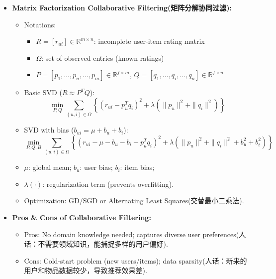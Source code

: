 \documentclass[UTF8]{ctexart}
\begin{document}
\begin{itemize}
    \item \textbf{Matrix Factorization Collaborative Filtering(矩阵分解协同过滤):}
    \begin{itemize}
        \item Notations: 
        \begin{itemize}
            \item $R = [r_{ui}] \in \mathbb{R}^{m \times n}$: incomplete user-item rating matrix
            \item $\Omega$: set of observed entries (known ratings)
            \item $P = [p_1, \ldots, p_u, \ldots, p_m] \in \mathbb{R}^{f \times m}$, \quad $Q = [q_1, \ldots, q_i, \ldots, q_n] \in \mathbb{R}^{f \times n}$
        \end{itemize}
        
        \item Basic SVD ($R \approx P^T Q$):
        \[\min_{P,Q} \sum_{(u,i) \in \Omega} \left\{ (r_{ui} - p_u^T q_i)^2 + \lambda (\|p_u\|^2 + \|q_i\|^2) \right\}\]
        
        \item SVD with bias ($b_{ui} = \mu + b_u + b_i$):
        \[\min_{P,Q,B} \sum_{(u,i) \in \Omega} \left\{ (r_{ui} - \mu - b_u - b_i - p_u^T q_i)^2 + \lambda (\|p_u\|^2 + \|q_i\|^2 + b_u^2 + b_i^2) \right\}\]
        
        \item $\mu$: global mean; $b_u$: user bias; $b_i$: item bias; 
        \item $\lambda(\cdot)$: regularization term (prevents overfitting).
        \item Optimization: GD/SGD or Alternating Least Squares(交替最小二乘法).
    \end{itemize}

    \item \textbf{Pros \& Cons of Collaborative Filtering:}
    \begin{itemize}
        \item Pros: No domain knowledge needed; captures diverse user preferences(人话：不需要领域知识，能捕捉多样的用户偏好).
        \item Cons: Cold-start problem (new users/items); data sparsity(人话：新来的用户和物品数据较少，导致推荐效果差).
    \end{itemize}
\end{itemize}
\end{document}
